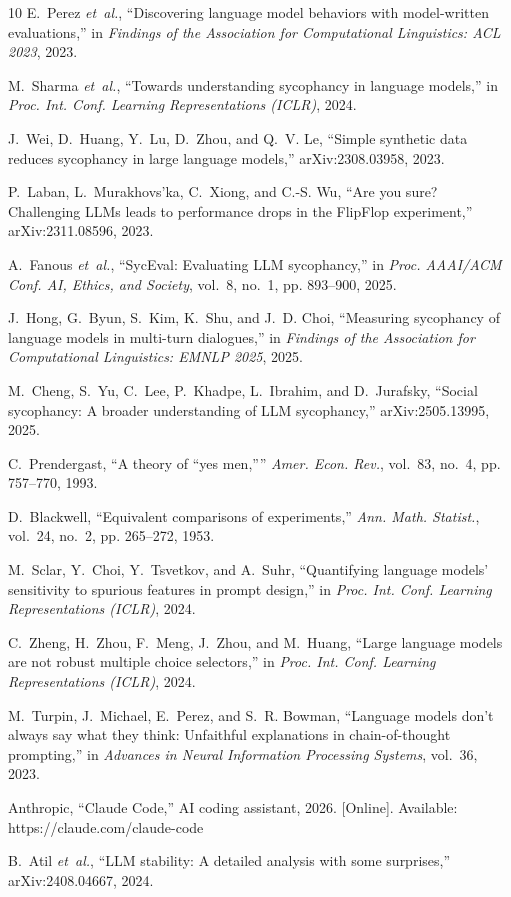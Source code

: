 \documentclass[journal]{IEEEtran}
\begin{document}
\begin{thebibliography}{10}
E.~Perez \emph{et~al.}, ``Discovering language model behaviors with model-written evaluations,'' in \emph{Findings of the Association for Computational Linguistics: ACL 2023}, 2023.

M.~Sharma \emph{et~al.}, ``Towards understanding sycophancy in language models,'' in \emph{Proc. Int. Conf. Learning Representations (ICLR)}, 2024.

J.~Wei, D.~Huang, Y.~Lu, D.~Zhou, and Q.~V. Le, ``Simple synthetic data reduces sycophancy in large language models,'' arXiv:2308.03958, 2023.

P.~Laban, L.~Murakhovs'ka, C.~Xiong, and C.-S. Wu, ``Are you sure? Challenging LLMs leads to performance drops in the FlipFlop experiment,'' arXiv:2311.08596, 2023.

A.~Fanous \emph{et~al.}, ``SycEval: Evaluating LLM sycophancy,'' in \emph{Proc. AAAI/ACM Conf. AI, Ethics, and Society}, vol.~8, no.~1, pp. 893--900, 2025.

J.~Hong, G.~Byun, S.~Kim, K.~Shu, and J.~D. Choi, ``Measuring sycophancy of language models in multi-turn dialogues,'' in \emph{Findings of the Association for Computational Linguistics: EMNLP 2025}, 2025.

M.~Cheng, S.~Yu, C.~Lee, P.~Khadpe, L.~Ibrahim, and D.~Jurafsky, ``Social sycophancy: A broader understanding of LLM sycophancy,'' arXiv:2505.13995, 2025.

C.~Prendergast, ``A theory of ``yes men,''{}'' \emph{Amer. Econ. Rev.}, vol.~83, no.~4, pp. 757--770, 1993.

D.~Blackwell, ``Equivalent comparisons of experiments,'' \emph{Ann. Math. Statist.}, vol.~24, no.~2, pp. 265--272, 1953.

M.~Sclar, Y.~Choi, Y.~Tsvetkov, and A.~Suhr, ``Quantifying language models' sensitivity to spurious features in prompt design,'' in \emph{Proc. Int. Conf. Learning Representations (ICLR)}, 2024.

C.~Zheng, H.~Zhou, F.~Meng, J.~Zhou, and M.~Huang, ``Large language models are not robust multiple choice selectors,'' in \emph{Proc. Int. Conf. Learning Representations (ICLR)}, 2024.

M.~Turpin, J.~Michael, E.~Perez, and S.~R. Bowman, ``Language models don't always say what they think: Unfaithful explanations in chain-of-thought prompting,'' in \emph{Advances in Neural Information Processing Systems}, vol.~36, 2023.

Anthropic, ``Claude Code,'' AI coding assistant, 2026. [Online]. Available: https://claude.com/claude-code

B.~Atil \emph{et~al.}, ``LLM stability: A detailed analysis with some surprises,'' arXiv:2408.04667, 2024.
\end{thebibliography}
\end{document}
